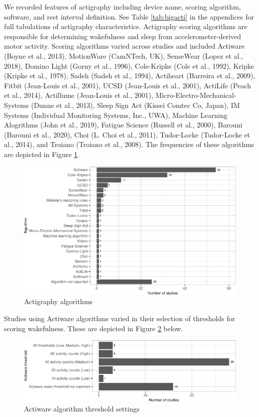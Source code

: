 \documentclass[
]{article}
\begin{document}
We recorded features of actigraphy including device name, scoring algorithm, software, and rest interval definition. See Table \ref{tab:bigacti} in the appendices for full tabulations of actigraphy characteristics. Actigraphy scoring algorithms are responsible for determining wakefulness and sleep from accelerometer-derived motor activity. Scoring algorithms varied across studies and included Actiware (Boyne et al., 2013), MotionWare (CamNTech, UK), SenseWear (Lopez et al., 2018), Domino Light (Gorny et al., 1996), Cole-Kripke (Cole et al., 1992), Kripke (Kripke et al., 1978), Sadeh (Sadeh et al., 1994), Actiheart (Barreira et al., 2009), Fitbit (Jean-Louis et al., 2001), UCSD (Jean-Louis et al., 2001), ActiLife (Peach et al., 2014), Actillume (Jean-Louis et al., 2001), Micro-Electro-Mechanical-Systems (Dunne et al., 2013), Sleep Sign Act (Kissei Comtec Co, Japan), IM Systems (Individual Monitoring Systems, Inc., UWA), Machine Learning Alogrithms (John et al., 2019), Fatigue Science (Russell et al., 2000), Barouni (Barouni et al., 2020), Choi (L. Choi et al., 2011), Tudor-Locke (Tudor-Locke et al., 2014), and Troiano (Troiano et al., 2008). The frequencies of these algorithms are depicted in Figure \ref{fig:algorithms}.

\begin{figure}
\centering
\includegraphics{review_markdown_files/figure-latex/algorithms-1.pdf}
\caption{\label{fig:algorithms}Actigraphy algorithms}
\end{figure}

Studies using Actiware algorithms varied in their selection of thresholds for scoring wakefulness. These are depicted in Figure \ref{fig:actiware} below.

\begin{figure}
\centering
\includegraphics{review_markdown_files/figure-latex/actiware-1.pdf}
\caption{\label{fig:actiware}Actiware algorithm threshold settings}
\end{figure}
\end{document}
